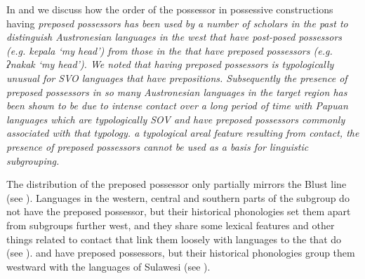 In 
and  we discuss how the order of the possessor
in possessive constructions having \it{preposed possessors} has
been used by a number of scholars in the past to distinguish
Austronesian languages in the west that have post-posed possessors (e.g.
 \it{kepala } ‘my head’) from those in the 
that have preposed possessors (e.g.
  \it{ ʔnakak} ‘my head’).
We noted that having preposed possessors is typologically unusual
for SVO languages that have prepositions.
Subsequently the presence of preposed possessors in so many Austronesian
languages in the target region has been shown to be due to intense
contact over a long period of time with Papuan languages which
are typologically SOV and have preposed possessors commonly associated with that typology.
 a typological areal feature resulting from contact,
the presence of preposed possessors cannot be used as a basis for linguistic subgrouping.

The distribution of the preposed possessor only partially mirrors
the Blust line (see ).
Languages in the western,
central and southern parts of the  subgroup
do not have the preposed possessor,
but their historical phonologies set them apart from subgroups
further west, and they share some lexical features
and other things related to contact that link them loosely with
languages to the  that do (see ).
 and  have preposed possessors,
but their historical phonologies group them westward with the
 languages of Sulawesi (see ).